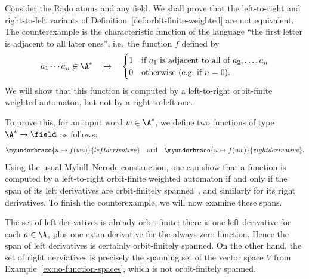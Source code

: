 \begin{example}
    Consider the Rado atoms and any field. 
    We shall prove that the left-to-right and right-to-left variants of Definition~\ref{def:orbit-finite-weighted} are not equivalent. 
    The counterexample is the characteristic function of the language ``the first letter is adjacent to all later ones'', 
    i.e.~the function $f$ defined by 
    \begin{align*}
        a_1 \cdots a_n \in \A^* \quad \mapsto \quad 
        \begin{cases}
            1 & \text{if $a_1$ is adjacent to all of $a_2,\ldots,a_{n}$}\\
            0 & \text{otherwise (e.g.~if $n = 0$).}
        \end{cases}
    \end{align*}
    We will show that this function is computed by a left-to-right orbit-finite weighted automaton, but not by a right-to-left one. 
    
    To prove this, for an input word $w \in \A^*$, we define two functions of type $\A^* \to \field$ as follows:
    \begin{align*}
        \myunderbrace{u \mapsto f(wu)}{left derivative}
        \quad \text{and} \quad 
        \myunderbrace{u \mapsto f(uw)}{right derivative}.
    \end{align*}
    Using the usual Myhill--Nerode construction, 
    one can show that a function is computed by a left-to-right orbit-finite weighted automaton 
    if and only if the span of its left derivatives are orbit-finitely spanned~\cite[Thm.~6.19]{aliceBob}, 
    and similarly for its right derivatives. 
    To finish the counterexample, we will now examine these spans.

    The set of left derivatives is already orbit-finite: 
    there is one left derivative for each $a \in \A$, plus one extra derivative for the always-zero function. 
    Hence the span of left derivatives is certainly orbit-finitely spanned.
    On the other hand, the set of right derviatives is precisely the spanning set of the vector space $V$ from Example~\ref{ex:no-function-spaces}, 
    which is not orbit-finitely spanned.
\lipicsEnd\end{example}


